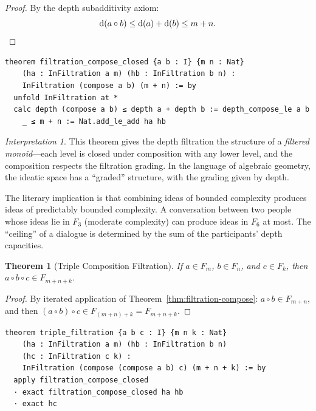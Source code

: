 \documentclass[11pt,openany]{book}
\theoremstyle{definition}
\theoremstyle{plain}
\newtheorem{theorem}[axiom]{Theorem}
\theoremstyle{remark}
\newtheorem{interpretation}[axiom]{Interpretation}
\newcommand{\compose}{\circ}                 %
\newcommand{\depth}{\operatorname{d}}       %
\begin{document}
\begin{proof}
By the depth subadditivity axiom:
\[
\depth(a \compose b) \leq \depth(a) + \depth(b) \leq m + n. \qedhere
\]
\end{proof}

\begin{lstlisting}[language=Lean4]
theorem filtration_compose_closed {a b : I} {m n : Nat}
    (ha : InFiltration a m) (hb : InFiltration b n) :
    InFiltration (compose a b) (m + n) := by
  unfold InFiltration at *
  calc depth (compose a b) ≤ depth a + depth b := depth_compose_le a b
    _ ≤ m + n := Nat.add_le_add ha hb
\end{lstlisting}

\begin{interpretation}
This theorem gives the depth filtration the structure of a \emph{filtered monoid}---each level is closed under composition with any lower level, and the composition respects the filtration grading. In the language of algebraic geometry, the ideatic space has a ``graded'' structure, with the grading given by depth.

The literary implication is that combining ideas of bounded complexity produces ideas of predictably bounded complexity. A conversation between two people whose ideas lie in $F_3$ (moderate complexity) can produce ideas in $F_6$ at most. The ``ceiling'' of a dialogue is determined by the sum of the participants' depth capacities.
\end{interpretation}

\begin{theorem}[Triple Composition Filtration]
If $a \in F_m$, $b \in F_n$, and $c \in F_k$, then $a \compose b \compose c \in F_{m+n+k}$.
\end{theorem}

\begin{proof}
By iterated application of Theorem~\ref{thm:filtration-compose}: $a \compose b \in F_{m+n}$, and then $(a \compose b) \compose c \in F_{(m+n)+k} = F_{m+n+k}$.
\end{proof}

\begin{lstlisting}[language=Lean4]
theorem triple_filtration {a b c : I} {m n k : Nat}
    (ha : InFiltration a m) (hb : InFiltration b n)
    (hc : InFiltration c k) :
    InFiltration (compose (compose a b) c) (m + n + k) := by
  apply filtration_compose_closed
  · exact filtration_compose_closed ha hb
  · exact hc
\end{lstlisting}
\end{document}
